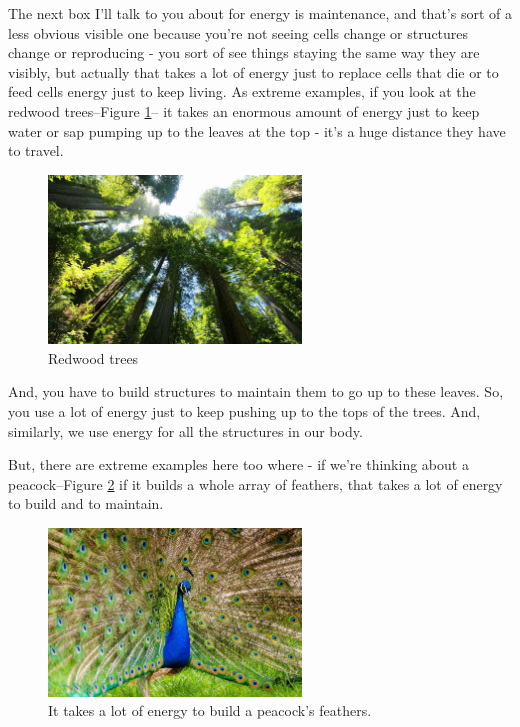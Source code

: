 \documentclass[]{article}
\begin{document}
The next box I'll talk to you about
for energy is maintenance,
and that's sort of a less obvious
visible one
because you're not seeing cells change
or structures change or reproducing -
you sort of see things
staying the same way they are visibly,
but actually that takes a lot of energy
just to replace cells that die
or to feed cells energy
just to keep living.
As extreme examples,
if you look at the redwood trees--Figure \ref{fig:maintenance}--
it takes an enormous amount of energy
just to keep water or sap
pumping up to the leaves at the top -
it's a huge distance they have to travel.
\begin{figure}[H]
	\begin{center}
		\caption{Redwood trees}\label{fig:maintenance}
		\includegraphics[width=0.6\textwidth]{maintenance}
	\end{center}
\end{figure}
And, you have to build structures
to maintain them to go up to these leaves.
So, you use a lot of energy
just to keep pushing
up to the tops of the trees.
And, similarly, we use energy
for all the structures in our body.

But, there are extreme examples here too
where -
if we're thinking about a peacock--Figure \ref{fig:peacock}
if it builds a whole array of feathers,
that takes a lot of energy to build
and to maintain.

\begin{figure}[H]
	\begin{center}
		\caption{It takes a lot of energy to build a peacock's feathers.}\label{fig:peacock}
		\includegraphics[width=0.6\textwidth]{peacock}
	\end{center}
\end{figure}
\end{document}
